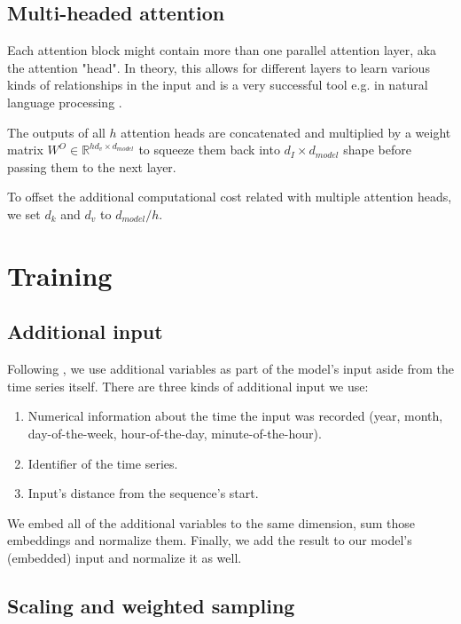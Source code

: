 \documentclass[en]{pracamgr}
\begin{document}
	\subsection{Multi-headed attention}
	
	Each attention block might contain more than one parallel attention layer, aka the attention "head". In theory, this allows for different layers to learn various kinds of relationships in the input and is a very successful tool e.g. in natural language processing \cite{tr}.
	
	The outputs of all $h$ attention heads are concatenated and multiplied by a weight matrix $W^O \in \mathbb{R}^{hd_{v} \times d_{model}}$ to squeeze them back into $d_I \times d_{model}$ shape before passing them to the next layer.
	
	To offset the additional computational cost related with multiple attention heads, we set $d_k$ and $d_v$ to $d_{model} / h$.
	
	\section{Training}
	
	\subsection{Additional input}
	
	Following \cite{enhancing}, we use additional variables as part of the model's input aside from the time series itself.
	There are three kinds of additional input we use:
	\begin{enumerate}
		\item Numerical information about the time the input was recorded (year, month, day-of-the-week, hour-of-the-day, minute-of-the-hour). 
		
		\item Identifier of the time series.
		
		\item Input's distance from the sequence's start. 
		
	\end{enumerate}
	We embed all of the additional variables to the same dimension, sum those embeddings and normalize them. Finally, we add the result to our model's (embedded) input and normalize it as well.
	
	
	\subsection{Scaling and weighted sampling}\label{s:scale}
	
\end{document}
